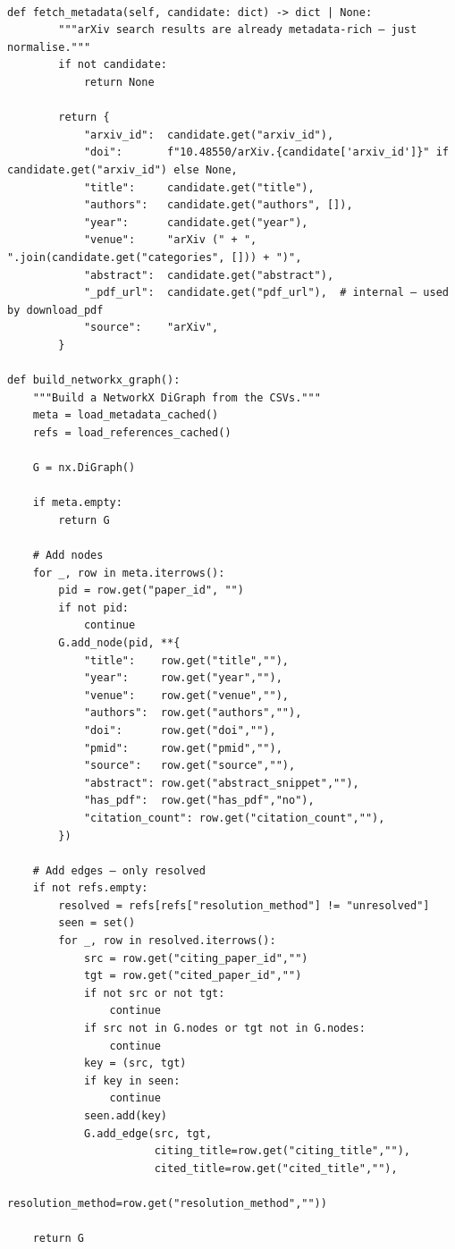 \begin{verbatim}

def fetch_metadata(self, candidate: dict) -> dict | None:
        """arXiv search results are already metadata-rich – just normalise."""
        if not candidate:
            return None

        return {
            "arxiv_id":  candidate.get("arxiv_id"),
            "doi":       f"10.48550/arXiv.{candidate['arxiv_id']}" if candidate.get("arxiv_id") else None,
            "title":     candidate.get("title"),
            "authors":   candidate.get("authors", []),
            "year":      candidate.get("year"),
            "venue":     "arXiv (" + ", ".join(candidate.get("categories", [])) + ")",
            "abstract":  candidate.get("abstract"),
            "_pdf_url":  candidate.get("pdf_url"),  # internal – used by download_pdf
            "source":    "arXiv",
        }
    
def build_networkx_graph():
    """Build a NetworkX DiGraph from the CSVs."""
    meta = load_metadata_cached()
    refs = load_references_cached()

    G = nx.DiGraph()

    if meta.empty:
        return G

    # Add nodes
    for _, row in meta.iterrows():
        pid = row.get("paper_id", "")
        if not pid:
            continue
        G.add_node(pid, **{
            "title":    row.get("title",""),
            "year":     row.get("year",""),
            "venue":    row.get("venue",""),
            "authors":  row.get("authors",""),
            "doi":      row.get("doi",""),
            "pmid":     row.get("pmid",""),
            "source":   row.get("source",""),
            "abstract": row.get("abstract_snippet",""),
            "has_pdf":  row.get("has_pdf","no"),
            "citation_count": row.get("citation_count",""),
        })

    # Add edges — only resolved
    if not refs.empty:
        resolved = refs[refs["resolution_method"] != "unresolved"]
        seen = set()
        for _, row in resolved.iterrows():
            src = row.get("citing_paper_id","")
            tgt = row.get("cited_paper_id","")
            if not src or not tgt:
                continue
            if src not in G.nodes or tgt not in G.nodes:
                continue
            key = (src, tgt)
            if key in seen:
                continue
            seen.add(key)
            G.add_edge(src, tgt,
                       citing_title=row.get("citing_title",""),
                       cited_title=row.get("cited_title",""),
                       resolution_method=row.get("resolution_method",""))

    return G
   
\end{verbatim}


